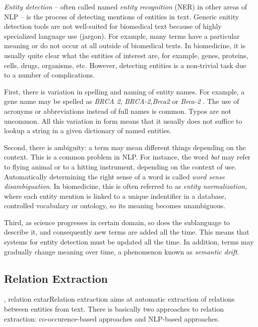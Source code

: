 \emph{Entity detection} -- often called named \emph{entity recognition} (NER) in other areas of NLP -- is the process of detecting mentions of entities in text.
Generic enitity detection tools are not well-suited for biomedical text because of highly specialized language use (jargon). 
For example, many terms have a particular meaning or do not occur at all outside of biomedical texts.
In biomedicine, it is usually quite clear what the entities of interest are, for example, genes, proteins, cells, drugs, organisms, etc.
However, detecting entities is a non-trivial task due to a number of complications.

First, there is variation in spelling and naming of entity names.
For example, a gene name may be spelled as \emph{BRCA 2},\emph{ BRCA-2},\emph{Brca2} or \emph{Brca-2} \citep{Krallinger2010Analysis}.
The use of acronyms or abbreviations instead of full names is common. 
Typos are not uncommon.
All this variation in form means that it usually does not suffice to lookup a string in a given dictionary of named entities.

Second, there is ambiguity: a term may mean different things depending on the context.
This is a common problem in NLP.
For instance, the word \emph{bat} may refer to flying animal or to a hitting instrument, depending on the context of use.
Automatically determining the right sense of a word is called \emph{word sense disambiguation}.
In biomedicine, this is often referred to as \emph{entity normalization}, where each entity mention is linked to a unique indentifier in a database, controlled vocabulary or ontology, so its meaning becomes unambiguous. 
 
Third, as science progresses in certain domain, so does the sublanguage to describe it, and consequently new terms are added all the time.
This means that systems for entity detection must be updated all the time. 
In addition, terms may gradually change meaning over time, a phenomenon known as \emph{semantic drift}.

\subsection{Relation Extraction}   

, relation extarRelation extraction aims at automatic extraction of relations between entities from text.
There is basically two approaches to relation extraction: co-occurence-based approaches and NLP-based approaches.

